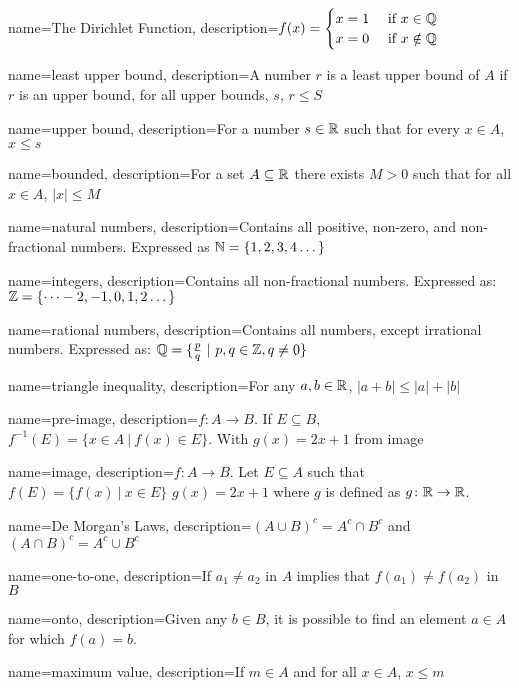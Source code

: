 \usepackage[toc, hyperfirst]{glossaries}

\makeglossaries

{
name=The Dirichlet Function,
description={\(f(x)=
\begin{cases}
    x = 1 &\text{ if } x \in \mathbb{Q} \\
    x = 0 &\text{ if } x \notin \mathbb{Q}
\end{cases}\)}
}

{   
    name=least upper bound,
    description={A number \(r\) is a least upper bound of \(A\) if \(r\) is an upper bound, for all upper bounds, \(s\), \(r \leq S\)}
}

{
    name=upper bound,
    description={For a number \(s \in \mathbb{R}\) such that for every \(x \in A\), \(x \leq s\)}
}

{
    name=bounded,
    description={For a set \(A \subseteq \mathbb{R}\) there exists \(M > 0\) such that for all \(x \in A\), \(|x| \leq M\)}
}

{
    name=natural numbers,
    description={Contains all positive, non-zero, and non-fractional numbers. Expressed as \(\mathbb{N} = \{1,2,3,4\dots\}\)}
}

{
    name=integers,
    description={Contains all non-fractional numbers. Expressed as: \(\mathbb{Z} = \{\dots-2,-1,0,1,2\dots\}\)}
}

{
    name=rational numbers,
    description={Contains all numbers, except irrational numbers. Expressed as: \(\mathbb{Q} = \{\frac{p}{q} \ | \ p,q \in \mathbb{Z}, q \ne 0\}\)}
}

{
    name=triangle inequality,
    description={For any \(a,b \in \mathbb{R}\), \(|a + b| \leq  |a| + |b|\)}
}

{
    name=pre-image,
    description={\(f \colon A \rightarrow B\). If \(E \subseteq B\), \(f^{-1}(E) = \{x\in A \ | \ f(x) \in E\}\). With \(g(x) = 2x + 1\) from image}
}

{
    name=image,
    description={\(f\colon A \rightarrow B\). Let \(E \subseteq A\) such that \(f(E) = \{f(x) \ | \ x \in E\}\) \(g(x) = 2x + 1\) where \(g\) is defined as \(g \colon \mathbb{R} \rightarrow \mathbb{R}\).}
}

{
    name=De Morgan's Laws,
    description={\((A \cup B)^c = A^c \cap B^c\) and \((A \cap B)^c = A^c \cup B^c\)}
}

{
    name=one-to-one,
    description={If \(a_1 \ne a_2\) in \(A\) implies that \(f(a_1) \ne f(a_2)\) in \(B\)}
}

{
    name=onto,
    description={Given any \(b\in B\), it is possible to find an element \(a \in A\) for which \(f(a) = b\).}
}

{
    name=maximum value,
    description={If \(m \in A\) and for all \(x\in A\), \(x \leq m\)}
}
